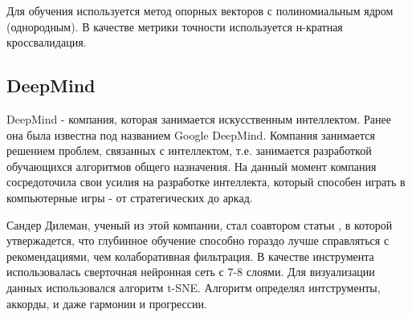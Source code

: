 Для обучения используется метод опорных векторов с полиномиальным ядром (однородным). В качестве метрики точности используется н-крат\-ная кроссвалидация.

\subsection{DeepMind}
\label{sec:analogues:deepmind}
DeepMind - компания, которая занимается искусственным интеллектом. Ранее она была известна под названием Google DeepMind. Компания занимается решением проблем, связанных с интеллектом, т.е. занимается разработкой обучающихся алгоритмов общего назначения. На данный момент компания сосредоточила свои усилия на разработке интеллекта, который \linebreak способен играть в компьютерные игры - от стратегических до аркад.

Сандер Дилеман, ученый из этой компании, стал соавтором статьи \cite{deepcontent}, в которой утвержадется, что глубинное обучение способно гораздо лучше справляться с рекомендациями, чем колаборативная фильтрация. В качестве инструмента использовалась сверточная нейронная сеть с 7-8 слоями. Для визуализации данных использовался алгоритм t-SNE. Алгоритм определял интструменты, аккорды, и даже гармонии и прогрессии.
